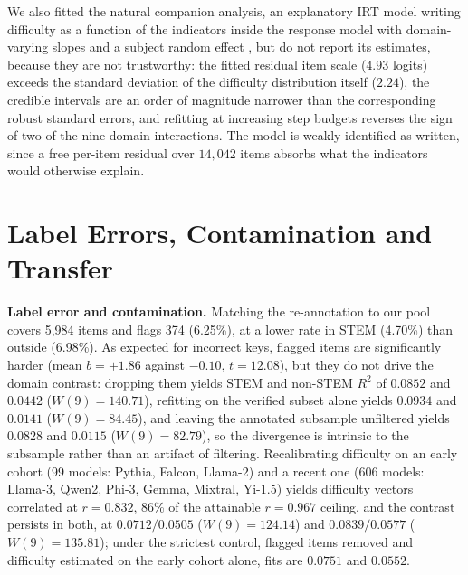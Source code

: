 We also fitted the natural companion analysis, an explanatory IRT model writing difficulty as a function of the indicators inside the response model with domain-varying slopes and a subject random effect \citep{fischer1973,deboeck2004}, but do not report its estimates, because they are not trustworthy: the fitted residual item scale ($4.93$ logits) exceeds the standard deviation of the difficulty distribution itself ($2.24$), the credible intervals are an order of magnitude narrower than the corresponding robust standard errors, and refitting at increasing step budgets reverses the sign of two of the nine domain interactions. The model is weakly identified as written, since a free per-item residual over $14{,}042$ items absorbs what the indicators would otherwise explain.

\section{Label Errors, Contamination and Transfer}\label{sec:labels}

\textbf{Label error and contamination.} Matching the \citet{gema2025} re-annotation to our pool covers 5,984 items and flags 374 (6.25\%), at a lower rate in STEM (4.70\%) than outside (6.98\%). As expected for incorrect keys, flagged items are significantly harder (mean $b = +1.86$ against $-0.10$, $t = 12.08$), but they do not drive the domain contrast: dropping them yields STEM and non-STEM $R^{2}$ of $0.0852$ and $0.0442$ ($W(9) = 140.71$), refitting on the verified subset alone yields $0.0934$ and $0.0141$ ($W(9) = 84.45$), and leaving the annotated subsample unfiltered yields $0.0828$ and $0.0115$ ($W(9) = 82.79$), so the divergence is intrinsic to the subsample rather than an artifact of filtering. Recalibrating difficulty on an early cohort (99 models: Pythia, Falcon, Llama-2) and a recent one (606 models: Llama-3, Qwen2, Phi-3, Gemma, Mixtral, Yi-1.5) yields difficulty vectors correlated at $r = 0.832$, 86\% of the attainable $r = 0.967$ ceiling, and the contrast persists in both, at $0.0712/0.0505$ ($W(9) = 124.14$) and $0.0839/0.0577$ ($W(9) = 135.81$); under the strictest control, flagged items removed and difficulty estimated on the early cohort alone, fits are $0.0751$ and $0.0552$.

